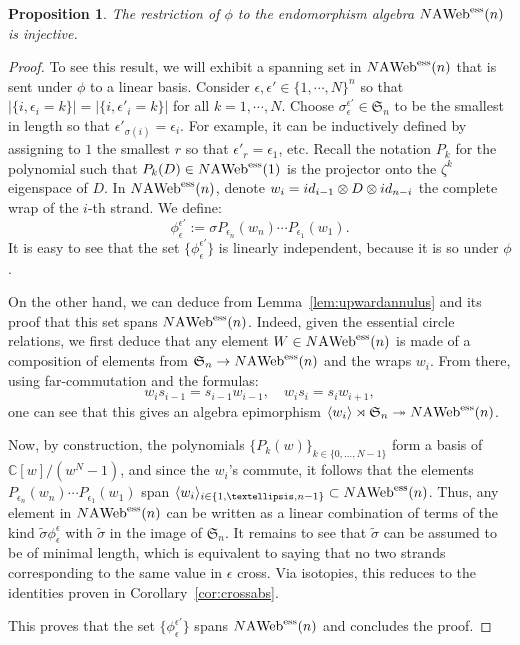 \documentclass[11pt]{article}
\newtheorem{prop}[theo]{Proposition}
\theoremstyle{definition}
\numberwithin{equation}{section}
\def\C{{\mathbb C}}
\newcommand{\id}{{\rm id}}
\newcommand{\cat}[1]{\ensuremath{\mbox{\bfseries {\upshape {#1}}}}}
\newcommand{\wrap}{D}
\newcommand{\AWeb}[1][]{#1\cat{A}\cat{Web}}
\newcommand{\essAWeb}[1][]{#1\AWeb^{\mathrm{ess}}}
\begin{document}
\begin{prop}\label{prop:faithful} The restriction of $\phi$ to the endomorphism algebra $\essAWeb[N](n)$ is injective.
\end{prop}
\begin{proof}
To see this result, we will exhibit a spanning set in $\essAWeb[N](n)$ that is sent under $\phi$ to a linear basis. Consider $\epsilon,\epsilon'\in \{1,\cdots,N\}^n$ so that $|\{i,\epsilon_i=k\}|=|\{i,\epsilon'_i=k\}|$ for all $k=1,\cdots, N$. Choose $\sigma_\epsilon^{\epsilon'}\in \mathfrak{S}_n$ to be the smallest in length so that $\epsilon'_{\sigma(i)}=\epsilon_i$. For example, it can be inductively defined by assigning to $1$ the smallest $r$ so that $\epsilon'_r=\epsilon_1$, etc. Recall the notation $P_k$ for the polynomial such that $P_k(D)\in \essAWeb[N](1)$ is the projector onto the $\zeta^k$ eigenspace of $D$. In $\essAWeb[N](n)$, denote $w_i=\id_{i-1}\otimes \wrap \otimes \id_{n-i}$ the complete wrap of the $i$-th strand. We define:
  \[
\phi_\epsilon^{\epsilon'}:=\sigma P_{\epsilon_n}(w_n)\cdots P_{\epsilon_1}(w_1).
\]
It is easy to see that the set $\{\phi_\epsilon^{\epsilon'}\}$ is linearly independent, because it is so under $\phi$.

On the other hand, we can deduce from Lemma~\ref{lem:upwardannulus} and its proof that this set spans $\essAWeb[N](n)$. Indeed, given the essential circle relations, we first deduce that any element $W\in \essAWeb[N](n)$ is made of a composition of elements from $\mathfrak{S}_n\rightarrow \essAWeb[N](n)$ and the wraps $w_i$. From there, using far-commutation and the formulas:
\[
w_is_{i-1}=s_{i-1}w_{i-1},\quad w_is_{i}=s_{i}w_{i+1},
\]
one can see that this gives an algebra epimorphism $ \langle w_i\rangle\rtimes \mathfrak{S}_n \twoheadrightarrow \essAWeb[N](n)$.

Now, by construction, the polynomials $\{P_k(w)\}_{k\in \{0,\dots,N-1\}}$ form a basis of $\C[w]/(w^N-1)$, and since the $w_i$'s commute, it follows that the elements $P_{\epsilon_n}(w_n)\cdots P_{\epsilon_1}(w_1)$ span $\langle w_i\rangle_{i\in \{1,\dots,n-1\}}\subset \essAWeb[N](n)$. Thus, any element in $\essAWeb[N](n)$ can be written as a linear combination of terms of the kind $\tilde{\sigma}\phi_{\epsilon}^{\epsilon}$ with $\tilde{\sigma}$ in the image of $\mathfrak{S}_n$. It remains to see that $\tilde{\sigma}$ can be assumed to be of minimal length, which is equivalent to saying that no two strands corresponding to the same value in $\epsilon$ cross.
Via isotopies, this reduces to the identities proven in Corollary~\ref{cor:crossabs}.


This proves that the set $\{\phi_{\epsilon}^{\epsilon'}\}$ spans $\essAWeb[N](n)$ and concludes the proof.
\end{proof}
\end{document}
